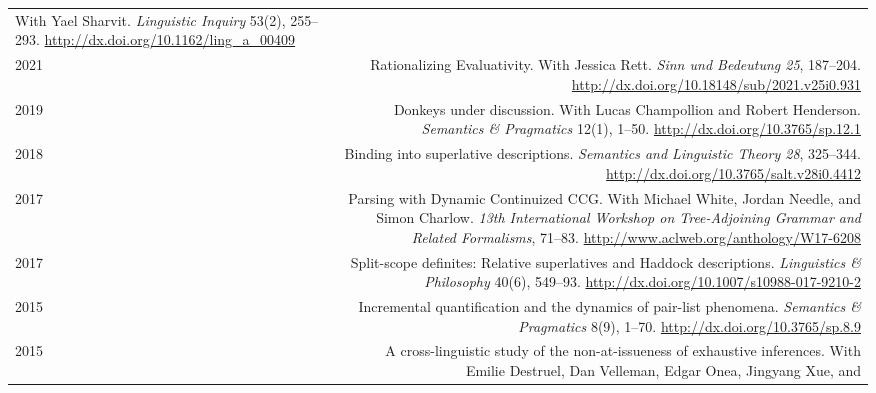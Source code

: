 \documentclass[12pt]{article}
\newcommand{\doi}[1]{\url{http://dx.doi.org/#1}}
\begin{document}
\begin{longtable}{LR}
          With Yael Sharvit.\newline
          \textit{Linguistic Inquiry} 53(2), 255--293.\newline
          \doi{10.1162/ling_a_00409}\\
  2021  & Rationalizing Evaluativity.\newline
          With Jessica Rett.\newline
          \textit{Sinn und Bedeutung 25}, 187--204.\newline
          \doi{10.18148/sub/2021.v25i0.931}\\
  2019  & Donkeys under discussion.\newline
          With Lucas Champollion and Robert Henderson.\newline
          \textit{Semantics \& Pragmatics} 12(1), 1--50.\newline
          \doi{10.3765/sp.12.1}\\
  2018  & Binding into superlative descriptions.\newline
          \textit{Semantics and Linguistic Theory 28}, 325--344.\newline
          \doi{10.3765/salt.v28i0.4412}\\
  2017  & Parsing with Dynamic Continuized CCG.\newline
          With Michael White, Jordan Needle, and Simon Charlow.\newline
          \textit{13th International Workshop on Tree-Adjoining Grammar and
          Related Formalisms}, 71--83.\newline
          \url{http://www.aclweb.org/anthology/W17-6208}\\
  2017  & Split-scope definites: Relative superlatives and Haddock
          descriptions.\newline
          \textit{Linguistics \& Philosophy} 40(6), 549--93.\newline
          \doi{10.1007/s10988-017-9210-2}\\
  2015  & Incremental quantification and the dynamics of pair-list phenomena.\newline
          \textit{Semantics \& Pragmatics} 8(9), 1--70.\newline
          \doi{10.3765/sp.8.9}\\
  2015  & A cross-linguistic study of the non-at-issueness of exhaustive
          inferences.\newline
          With Emilie Destruel, Dan Velleman, Edgar Onea, Jingyang Xue, and

\end{longtable}
\end{document}
